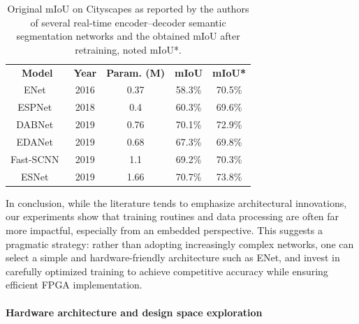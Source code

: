 \documentclass[11pt]{report}
\begin{document}
\begin{table}[h]
  \centering
  \caption{Original mIoU on Cityscapes as reported by the authors of several real-time encoder–decoder semantic segmentation networks and the obtained mIoU after retraining, noted mIoU*.}
  \begin{tabular}{c|c|c|c|c}
    \textbf{Model}                                              & \textbf{Year} & \textbf{Param. (M)} & \textbf{mIoU} & \textbf{mIoU*} \\
    ENet~\cite{paszke2016enet}                                  & 2016          & 0.37                & 58.3\%        & 70.5\%         \\\hline
    ESPNet~\cite{mehta2018espnetefficientspatialpyramid}        & 2018          & 0.4                 & 60.3\%        & 69.6\%         \\\hline
    DABNet~\cite{li2019dabnetdepthwiseasymmetricbottleneck}     & 2019          & 0.76                & 70.1\%        & 72.9\%         \\\hline
    EDANet~\cite{lo2019efficientdensemodulesasymmetric}         & 2019          & 0.68                & 67.3\%        & 69.8\%         \\\hline
    Fast-SCNN~\cite{poudel2019fastscnnfastsemanticsegmentation} & 2019          & 1.1                 & 69.2\%        & 70.3\%         \\\hline
    ESNet~\cite{wang2019esnetefficientsymmetricnetwork}         & 2019          & 1.66                & 70.7\%        & 73.8\%         \\
  \end{tabular}
  \label{tab:retrain}
\end{table}

In conclusion, while the literature tends to emphasize architectural innovations, our experiments show that training routines and data processing are often far more impactful, especially from an embedded perspective. This suggests a pragmatic strategy: rather than adopting increasingly complex networks, one can select a simple and hardware-friendly architecture such as ENet, and invest in carefully optimized training to achieve competitive accuracy while ensuring efficient FPGA implementation.


\paragraph{Hardware architecture and design space exploration}
\end{document}
